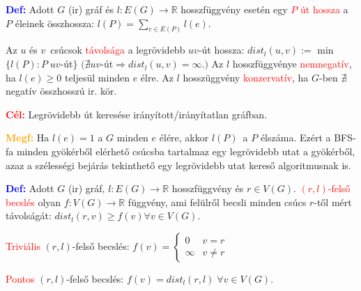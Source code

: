 \documentclass[../../szobeli.tex]{subfiles}
\begin{document}
\begin{itemize}
            \textbf{\textcolor{blue}{Def:}} Adott $G$ (ir) gráf és $l : E(G) \rightarrow \mathbb{R}$ hosszfüggvény esetén egy \textcolor{red}{$P$ út hossza} a $P$ éleinek összhossza: $l(P) = \sum_{e\in E(P)} l(e)$.

            Az $u$ és $v$ csúcsok \textcolor{red}{távolsága} a legrövidebb $uv$-út hossza: $dist_l(u,v):=$ min$\{l(P):P \;uv$-út$\}$ $(\nexists uv$-út$\Rightarrow dist_l (u,v)= \infty.)$ Az $l$  hosszfüggvénye \textcolor{red}{nemnegatív}, ha $l(e) \geq 0$ teljesül minden $e$ élre. Az $l$ hosszüggvény \textcolor{red}{konzervatív}, ha $G$-ben $\nexists$ negatív összhosszú ir. kör.

            \textbf{\textcolor{red}{Cél:}} Legrövidebb út keresése irányított/irányítatlan gráfban.

            \textbf{\textcolor{orange}{Megf:}} Ha $l(e) = 1 $ a $G$ minden $e$ élére, akkor $l(P)$ a $P$ élszáma. Ezért a BFS-fa minden gyökérből elérhető csúcsba tartalmaz egy legrövidebb utat a gyökérből, azaz a szélességi bejárás tekinthető egy legrövidebb utat kereső algoritmusnak is. 

            \textbf{\textcolor{blue}{Def:}} Adott $G$ (ir) gráf, $l : E(G) \rightarrow \mathbb{R}$ hosszfüggvény és $r \in V(G)$. \textcolor{red}{$(r,l)$-felső becslés} olyan $f: V(G) \rightarrow \mathbb{R}$ függvény, ami felülről becsli minden csúcs $r$-től mért távolságát: $dist_l (r,v) \geq f(v) \forall v \in V(G)$.

            \textcolor{red}{Triviális} $(r,l)$-felső becslés:
            $
                f(v) = \begin{cases}
                    0 & v = r \\
                    \infty & v \neq r
                \end{cases}
            $

            \textcolor{red}{Pontos} $(r,l)$-felső becslés: $f(v) = dist_l(r,l)\; \forall v \in V(G)$.
    \end{itemize}
\end{document}

